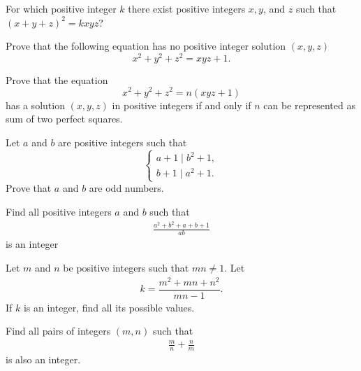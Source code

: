 \documentclass{subfile}
\begin{document}
	\begin{problem}[Mongolia 2000] %
		For which positive integer $k$ there exist positive integers $x,y$, and $z$ such that $(x+y+z)^2= kxyz$?
	\end{problem}

	\begin{problem} %
		Prove that the following equation has no positive integer solution $(x,y,z)$ \[x^2+y^2+z^2=xyz+1.\]
	\end{problem}

	\begin{problem} %
		Prove that the equation \[x^2+y^2+z^2=n(xyz+1)\] has a solution $(x,y,z)$ in positive integers if and only if $n$ can be represented as sum of two perfect squares.
	\end{problem}

	\begin{problem} %
		Let $a$ and $b$ are positive integers such that \[\left\{ \begin{array}{l} a + 1\mid {b^2} + 1,\\ b + 1\mid{a^2} + 1. \end{array} \right.\] Prove that $a$ and $b$ are odd numbers.
	\end{problem}

	\begin{problem} %
		Find all positive integers $a$ and $b$ such that
			\begin{align*}
				 \frac{a^2+b^2+a+b+1}{ab}
			\end{align*}
		is an integer
	\end{problem}

	\begin{problem} %
		Let $m$ and $n$ be positive integers such that $mn \neq 1$. Let
			\begin{align*}
				k= \dfrac{m^2+mn+n^2}{mn-1}.
			\end{align*}
		If $k$ is an integer, find all its possible values.
	\end{problem}

	\begin{problem}
		Find all pairs of integers $( m, n )$ such that
			\begin{align*}
				 \frac{ m } { n } + \frac{ n}{m}
			\end{align*}
		is also an integer.
	\end{problem}
\end{document}
